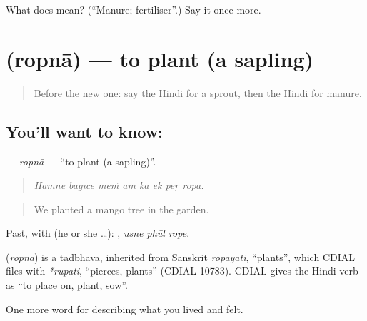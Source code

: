 \begin{tcolorbox}[breakable,colback=teal!4,colframe=teal!35!black,title={Before you move on}]
What does  mean? (\textquotedblleft{}Manure; fertiliser\textquotedblright{}.) Say it once more.
\end{tcolorbox}
\section[\texorpdfstring{\hi{रोपना} (ropnā)}{रोपना (ropnā)}]{ (ropnā) — to plant (a sapling)}

\label{lesson:HI-C525-ropna}



\begin{quote}
Before the new one: say the Hindi for a sprout, then the Hindi for manure.
\end{quote}

\subsection*{You'll want to know: }
\textbf{} — \emph{ropnā} — \textquotedblleft{}to plant (a sapling)\textquotedblright{}.

\begin{quote}
       
\end{quote}

\begin{quote}
\emph{Hamne bagīce meṁ ām kā ek peṛ ropā.}
\end{quote}

\begin{quote}
We planted a mango tree in the garden.
\end{quote}

Past, with  (he or she …):   , \emph{usne phūl rope}.

\begin{cousinweb}
\textbf{} (\emph{ropnā}) is a tadbhava, inherited from Sanskrit \emph{rōpayati}, \textquotedblleft{}plants\textquotedblright{}, which CDIAL files with \emph{*rupati}, \textquotedblleft{}pierces, plants\textquotedblright{} (CDIAL 10783). CDIAL gives the Hindi verb as \textquotedblleft{}to place on, plant, sow\textquotedblright{}.
\end{cousinweb}

\begin{grammarlens}[title={What you've built}]
One more word for describing what you lived and felt.
\end{grammarlens}

